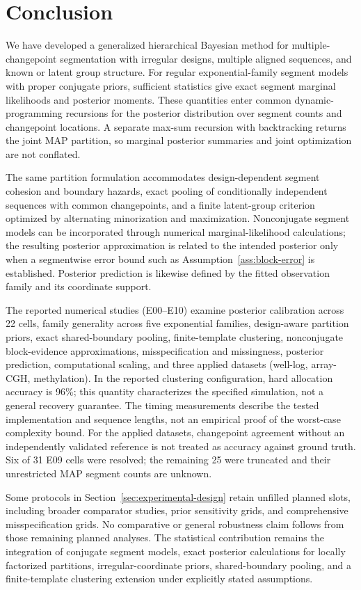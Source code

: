 \section{Conclusion}
\label{sec:conclusion}

We have developed a generalized hierarchical Bayesian method for multiple-changepoint segmentation with irregular designs, multiple aligned sequences, and known or latent group structure. For regular exponential-family segment models with proper conjugate priors, sufficient statistics give exact segment marginal likelihoods and posterior moments. These quantities enter common dynamic-programming recursions for the posterior distribution over segment counts and changepoint locations. A separate max-sum recursion with backtracking returns the joint MAP partition, so marginal posterior summaries and joint optimization are not conflated.

The same partition formulation accommodates design-dependent segment cohesion and boundary hazards, exact pooling of conditionally independent sequences with common changepoints, and a finite latent-group criterion optimized by alternating minorization and maximization. Nonconjugate segment models can be incorporated through numerical marginal-likelihood calculations; the resulting posterior approximation is related to the intended posterior only when a segmentwise error bound such as Assumption~\ref{ass:block-error} is established. Posterior prediction is likewise defined by the fitted observation family and its coordinate support.

The reported numerical studies (E00--E10) examine posterior calibration across 22 cells, family generality across five exponential families, design-aware partition priors, exact shared-boundary pooling, finite-template clustering, nonconjugate block-evidence approximations, misspecification and missingness, posterior prediction, computational scaling, and three applied datasets (well-log, array-CGH, methylation). In the reported clustering configuration, hard allocation accuracy is 96\%; this quantity characterizes the specified simulation, not a general recovery guarantee. The timing measurements describe the tested implementation and sequence lengths, not an empirical proof of the worst-case complexity bound. For the applied datasets, changepoint agreement without an independently validated reference is not treated as accuracy against ground truth. Six of 31 E09 cells were resolved; the remaining 25 were truncated and their unrestricted MAP segment counts are unknown.

Some protocols in Section~\ref{sec:experimental-design} retain unfilled planned slots, including broader comparator studies, prior sensitivity grids, and comprehensive misspecification grids. No comparative or general robustness claim follows from those remaining planned analyses. The statistical contribution remains the integration of conjugate segment models, exact posterior calculations for locally factorized partitions, irregular-coordinate priors, shared-boundary pooling, and a finite-template clustering extension under explicitly stated assumptions.
